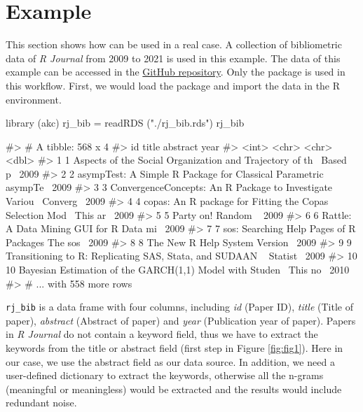 \hypertarget{example}{%
\section{Example}\label{example}}

This section shows how  can be used in a real case. A
collection of bibliometric data of \emph{R Journal} from 2009 to 2021 is
used in this example. The data of this example can be accessed in the
\href{https://github.com/hope-data-science/RJ_akc}{GitHub repository}.
Only the  package is used in this workflow. First, we would
load the package and import the data in the R environment.

\begin{Schunk}
\begin{Sinput}
library (akc)
rj_bib = readRDS ("./rj_bib.rds")
rj_bib
\end{Sinput}
\begin{Soutput}
#> # A tibble: 568 x 4
#>       id title                                                    abstract  year
#>    <int> <chr>                                                    <chr>    <dbl>
#>  1     1 Aspects of the Social Organization and Trajectory of th~ Based p~  2009
#>  2     2 asympTest: A Simple R Package for Classical Parametric ~ asympTe~  2009
#>  3     3 ConvergenceConcepts: An R Package to Investigate Variou~ Converg~  2009
#>  4     4 copas: An R package for Fitting the Copas Selection Mod~ This ar~  2009
#>  5     5 Party on!                                                Random ~  2009
#>  6     6 Rattle: A Data Mining GUI for R                          Data mi~  2009
#>  7     7 sos: Searching Help Pages of R Packages                  The sos~  2009
#>  8     8 The New R Help System                                    Version~  2009
#>  9     9 Transitioning to R: Replicating SAS, Stata, and SUDAAN ~ Statist~  2009
#> 10    10 Bayesian Estimation of the GARCH(1,1) Model with Studen~ This no~  2010
#> # ... with 558 more rows
\end{Soutput}
\end{Schunk}

\texttt{rj\_bib} is a data frame with four columns, including \emph{id}
(Paper ID), \emph{title} (Title of paper), \emph{abstract} (Abstract of
paper) and \emph{year} (Publication year of paper). Papers in \emph{R
Journal} do not contain a keyword field, thus we have to extract the
keywords from the title or abstract field (first step in Figure
\ref{fig:fig1}). Here in our case, we use the abstract field as our data
source. In addition, we need a user-defined dictionary to extract the
keywords, otherwise all the n-grams (meaningful or meaningless) would be
extracted and the results would include redundant noise.

